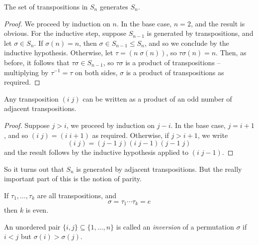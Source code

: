 \documentclass{../template/note}
\begin{document}
    \begin{theorem}
        The set of transpositions in \(S_n\) generates \(S_n\).
    \end{theorem}
    
    \begin{proof}
        We proceed by induction on \(n\). In the base case, \(n=2\), and the result is obvious. For the inductive step, suppose \(S_{n-1}\) is generated by transpositions, and let \(\sigma \in S_n\). If \(\sigma(n) = n\), then \(\sigma \in S_{n-1} \leq S_n\), and so we conclude by the inductive hypothesis. Otherwise, let \(\tau = (n \; \sigma(n))\), so \(\tau \sigma(n) = n\). Then, as before, it follows that \(\tau \sigma \in S_{n-1}\), so \(\tau \sigma\) is a product of transpositions -- multiplying by \(\tau^{-1} = \tau\) on both sides, \(\sigma\) is a product of transpositions as required.
    \end{proof}

    
    \begin{lemma}
        Any transposition \((i \; j)\) can be written as a product of an odd number of adjacent transpositions.
        \label{adjacent-transpositions}
    \end{lemma}
    
    \begin{proof}
        Suppose \(j > i\), we proceed by induction on \(j-i\). In the base case, \(j=i+1\), and so \((i \; j) = (i \; i+1)\) as required. Otherwise, if \(j>i+1\), we write
        \[
            (i\; j) = (j-1 \; j)(i \; j-1)(j-1 \; j)
        \]
        and the result follows by the inductive hypothesis applied to \((i \; j-1)\).
    \end{proof}
    
    So it turns out that \(S_n\) is generated by adjacent transpositions. But the really important part of this is the notion of parity.

    \begin{lemma}
        If \(\tau_1, \dots, \tau_k\) are all transpositions, and
        \[
            \sigma = \tau_1 \cdots \tau_k = e
        \]
        then \(k\) is even.
    \end{lemma}

    \begin{definition}
        An unordered pair \(\{i, j\} \subseteq \{1, \dots, n\}\) is called an \emph{inversion} of a permutation \(\sigma\) if \(i < j\) but \(\sigma(i) > \sigma(j)\).
    \end{definition}
    
\end{document}
